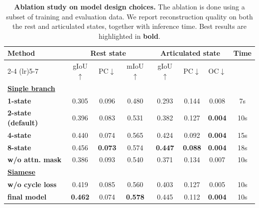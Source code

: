 \begin{table}[tb!]
    \centering
    \caption{\textbf{Ablation study on model design choices.}
    The ablation is done using a subset of training and evaluation data.
    We report reconstruction quality on both the rest and articulated states, together with inference time. 
    Best results are highlighted in \textbf{bold}.}
    \label{tab:ablation}
    \renewcommand{\arraystretch}{1.0}

    \begin{tabular}{@{} l ccc ccc c @{}}
        \toprule
        \multirow{2}{*}{\textbf{Method}} 
        & \multicolumn{3}{c}{\textbf{Rest state}} 
        & \multicolumn{3}{c}{\textbf{Articulated state}} 
        & \multirow{2}{*}{\textbf{Time}} \\
        \cmidrule(lr){2-4} \cmidrule(lr){5-7}
        & gIoU$\uparrow$ & PC$\downarrow$ & mIoU$\uparrow$ 
        & gIoU$\uparrow$ & PC$\downarrow$ & OC$\downarrow$ 
        & \\
        \midrule

        \multicolumn{8}{l}{\underline{\textbf{Single branch}}} \\
        \textbf{1-state}     
        & {0.305} & {0.096} & {0.480} & {0.293} & {0.144} & {0.008} & {7s} \\
        
        \textbf{2-state (default)}    
        & {0.396} & {0.083} & {0.531} & {0.382} & {0.127} & \textbf{0.004} & {10s} \\
        
        \textbf{4-state}     
        & {0.440} & {0.074} & {0.565} & {0.424} & {0.092} & \textbf{0.004} & {15s} \\
        
        \textbf{8-state}     
        & {0.456} & \textbf{0.073} & {0.574} & \textbf{0.447} & \textbf{0.088} & \textbf{0.004} & {18s} \\
        
        \textbf{w/o attn. mask}  
        & {0.386} & {0.093} & {0.540} & {0.371} & {0.134} & {0.007} & {10s} \\ 

        \midrule 
        \multicolumn{8}{l}{\underline{\textbf{Siamese}}} \\
        
        \textbf{w/o cycle loss} 
        & {0.419} & {0.085} & {0.560} & {0.403} & {0.127} & {0.005} & {10s} \\

        \textbf{final model} 
        & \textbf{0.462} & {0.074} & \textbf{0.578} & {0.445} & {0.112} & \textbf{0.004} & {10s} \\        
        
        \bottomrule
    \end{tabular}
\end{table}
